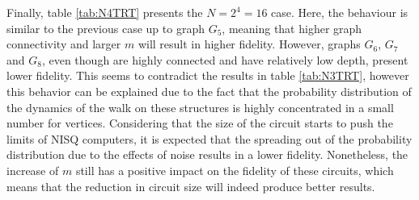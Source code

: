 \documentclass[../../dissertation.tex]{subfiles}
\begin{document}
\vspace{-0.2cm}\par
\begin{table}[!h]
\centering
{}
\caption{Fidelity of quantum state with N=16, backend \textit{Toronto}, and t=1.}
\label{tab:N4TRT}
\end{table}
Finally,  table \ref{tab:N4TRT} presents the $N = 2^4 = 16$ case. Here, the behaviour is similar to the previous case up to graph $G_5$, meaning that higher graph connectivity and larger $m$ will result in higher fidelity. However, graphs $G_6$, $G_7$ and $G_8$, even though are highly connected and have relatively low depth, present lower fidelity. This seems to contradict the results in table \ref{tab:N3TRT}, however this behavior can be explained due to the fact that the probability distribution of the dynamics of the walk on these structures is highly concentrated in a small number for vertices. Considering that the size of the circuit starts to push the limits of NISQ computers, it is expected that the spreading out of the probability distribution due to the effects of noise results in a lower fidelity. Nonetheless, the increase of $m$ still has a positive impact on the fidelity of these circuits, which means that the reduction in circuit size will indeed produce better results.
\end{document}
